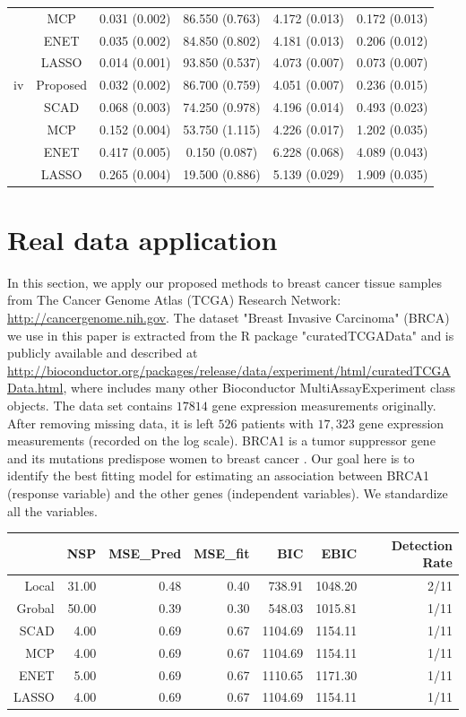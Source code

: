 \documentclass[12pt]{article}
\begin{document}
\begin{table}[H]
\begin{tabular}{cc|c|c|c|c}
  &MCP & 0.031 (0.002) & 86.550 (0.763) & 4.172 (0.013) & 0.172 (0.013) \\ 
  &ENET & 0.035 (0.002) & 84.850 (0.802) & 4.181 (0.013) & 0.206 (0.012) \\ 
  &LASSO & 0.014 (0.001) & 93.850 (0.537) & 4.073 (0.007) & 0.073 (0.007) \\ 
    \hline
    iv&Proposed&0.032 (0.002) & 86.700 (0.759) & 4.051 (0.007) & 0.236 (0.015) \\
&SCAD & 0.068 (0.003) & 74.250 (0.978) & 4.196 (0.014) & 0.493 (0.023) \\ 
  &MCP & 0.152 (0.004) & 53.750 (1.115) & 4.226 (0.017) & 1.202 (0.035) \\ 
  &ENET & 0.417 (0.005) & 0.150 (0.087) & 6.228 (0.068) & 4.089 (0.043) \\ 
  &LASSO & 0.265 (0.004) & 19.500 (0.886) & 5.139 (0.029) & 1.909 (0.035) \\ 
    \hline
  \end{tabular}
\end{table}


\section{Real data application}
 In this section, we apply our proposed methods to breast cancer tissue samples from The Cancer Genome Atlas (TCGA) Research Network: \url{http://cancergenome.nih.gov}. The dataset "Breast Invasive Carcinoma" (BRCA) we use in this paper is extracted from the R package "curatedTCGAData" and is publicly available and described at \url{http://bioconductor.org/packages/release/data/experiment/html/curatedTCGAData.html}, where includes many other Bioconductor MultiAssayExperiment class objects. The data set contains $17814$ gene expression measurements originally. After removing missing data, it is left $526$ patients with $17,323$ gene expression measurements (recorded on the log scale).  BRCA1 is a tumor suppressor gene and its mutations predispose women to breast cancer \citep{findlay2018accurate}. Our goal here is to identify the best fitting model for estimating an association between BRCA1 (response variable) and the other genes (independent variables). We standardize all the variables. 

\begin{table}[ht]
\centering
\begin{tabular}{rrrrrrr}
  \hline
 & NSP & MSE\_Pred & MSE\_fit & BIC & EBIC & Detection Rate\\ 
  \hline
  Local & 31.00 & 0.48 & 0.40 & 738.91 & 1048.20 & 2/11\\ 
  Grobal & 50.00 & 0.39 & 0.30 & 548.03 & 1015.81 & 1/11\\ 
  SCAD & 4.00 & 0.69 & 0.67 & 1104.69 & 1154.11 & 1/11\\ 
  MCP & 4.00 & 0.69 & 0.67 & 1104.69 & 1154.11 & 1/11\\ 
  ENET & 5.00 & 0.69 & 0.67 & 1110.65 & 1171.30 & 1/11\\ 
  LASSO & 4.00 & 0.69 & 0.67 & 1104.69 & 1154.11 & 1/11\\ 
   \hline
\end{tabular}
\end{table}
\end{document}
